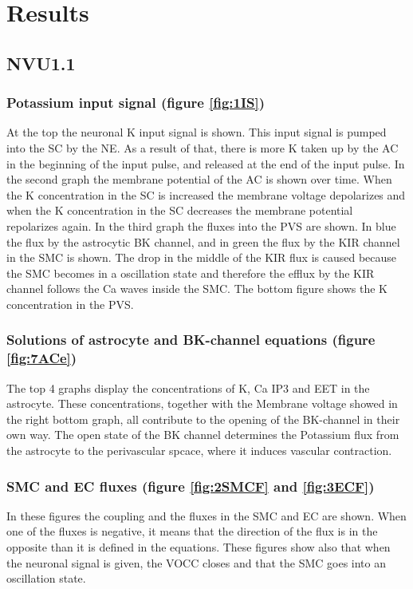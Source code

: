 %
	\section{Results}
	\subsection {NVU1.1}
	\subsubsection*{Potassium input signal (figure \ref{fig:1IS})}
	At the top the neuronal \gls{K} input signal is shown. This input signal is pumped into the SC by the \gls{NE}. As a result of that, there is more \gls{K} taken up by the \gls{AC} in the beginning of the input pulse, and released at the end of the input pulse. In the second graph the membrane potential of the AC is shown over time. When the \gls{K} concentration in the SC is increased the membrane voltage depolarizes and when the \gls{K} concentration in the SC decreases the membrane potential repolarizes again.
	In the third graph the fluxes into the PVS are shown. In blue the flux by the astrocytic BK channel, and in green the flux by the KIR channel in the SMC is shown. The drop in the middle of the KIR flux is caused because the SMC becomes in a oscillation state and therefore the efflux by the KIR channel follows the \gls{Ca} waves inside the SMC.
	The bottom figure shows the \gls{K} concentration in the PVS.
	
	\subsubsection*{Solutions of astrocyte and BK-channel equations (figure \ref{fig:7ACe})}
	 The top 4 graphs display the concentrations of \gls{K}, \gls{Ca} \gls{IP3} and EET in the astrocyte. These concentrations, together with the Membrane voltage showed in the right bottom graph, all contribute to the opening of the BK-channel in their own way. The open state of the BK channel determines the Potassium flux from the astrocyte to the perivascular spcace, where it induces vascular contraction.
	
	\subsubsection*{SMC and EC fluxes (figure \ref{fig:2SMCF} and \ref{fig:3ECF})}
	In these figures the coupling and the fluxes in the SMC and EC are shown. When one of the fluxes is negative, it means that the direction of the flux is in the opposite than it is defined in the equations. These figures show also that when the neuronal signal is given, the VOCC closes and that the SMC goes into an oscillation state. 
	
